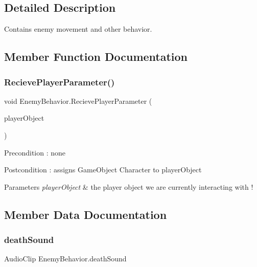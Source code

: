 \subsection{Detailed Description}
Contains enemy movement and other behavior. 

\subsection{Member Function Documentation}
\mbox{\label{class_enemy_behavior_a1a0d6efe8ce9e53a0e4bddd06c379097}} 
\subsubsection{\texorpdfstring{RecievePlayerParameter()}{RecievePlayerParameter()}}
{\footnotesize\ttfamily void Enemy\+Behavior.\+Recieve\+Player\+Parameter (\begin{DoxyParamCaption}\item[{Game\+Object}]{player\+Object }\end{DoxyParamCaption})}

\begin{DoxyPrecond}{Precondition}
\+: none 
\end{DoxyPrecond}
\begin{DoxyPostcond}{Postcondition}
\+: assigns Game\+Object Character to player\+Object 
\end{DoxyPostcond}

\begin{DoxyParams}{Parameters}
{\em player\+Object} & the player object we are currently interacting with ! \\
\hline
\end{DoxyParams}


\subsection{Member Data Documentation}
\mbox{\label{class_enemy_behavior_a82176ba450bef73880b2ff7db3123037}} 
\subsubsection{\texorpdfstring{deathSound}{deathSound}}
{\footnotesize\ttfamily Audio\+Clip Enemy\+Behavior.\+death\+Sound}



